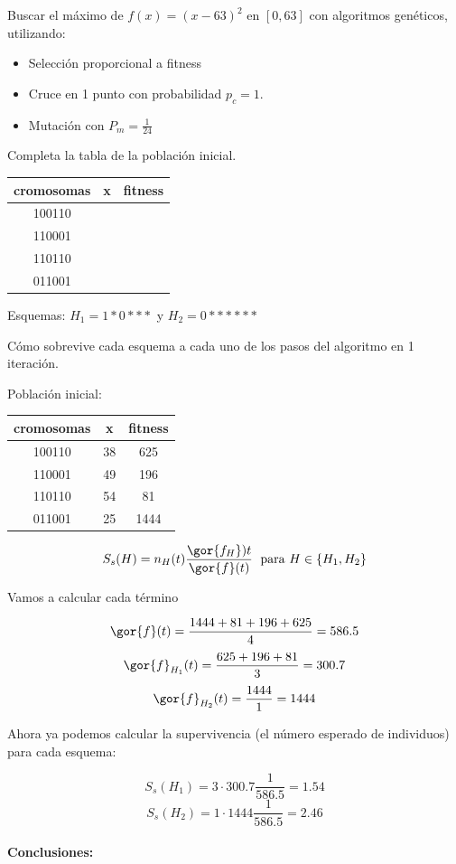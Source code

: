 \documentclass{apuntes}
\begin{document}
\begin{problem}[1]

Buscar el máximo de $f(x) = (x-63)^2$ en $[0,63]$ con algoritmos genéticos, utilizando:
\begin{itemize}
	\item Selección proporcional a fitness
	\item Cruce en 1 punto con probabilidad $p_c = 1$.
	\item Mutación con $P_m = \frac{1}{24}$
\end{itemize}

\spart Completa la tabla de la población inicial.


\begin{tabular}{c|cc}
cromosomas & x & fitness\\\hline
100110 & & \\
110001 & & \\
110110 & & \\
011001 & & 
\end{tabular}


\spart
Esquemas: $H_1 = 1*0***$ y $H_2=0******$


Cómo sobrevive cada esquema a cada uno de los pasos del algoritmo en 1 iteración.

\solution
\ppart
Población inicial:
\begin{center}
\begin{tabular}{c|cc}
cromosomas & x & fitness\\\hline
100110 & 38 & 625\\
110001 & 49 & 196\\
110110 & 54 & 81\\
011001 & 25 & 1444
\end{tabular}
\end{center}
\ppart 

\[S_s(H) = n_H(t) \frac{\gor{f_H})t}{\gor{f}(t)}\; \text{ para } H\in \{H_1,H_2\}\]


Vamos a calcular cada término

\[\gor{f}(t) = \frac{1444+81+196+625}{4}=586.5\]
\[\gor{f}_{H_1}(t) = \frac{625+196+81}{3}=300.7\]
\[\gor{f}_{H_2}(t) = \frac{1444}{1}=1444\]

Ahora ya podemos calcular la supervivencia (el número esperado de individuos) para cada esquema:

\[S_s(H_1) = 3·300.7\frac{1}{586.5} = 1.54\]
\[S_s(H_2) = 1·1444\frac{1}{586.5} = 2.46\]

\paragraph{Conclusiones:}


\end{problem}
\end{document}
